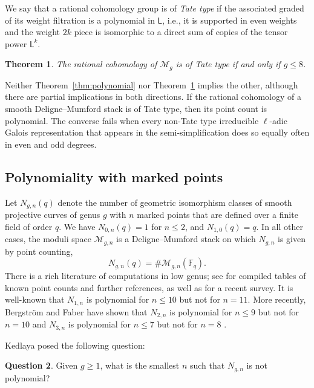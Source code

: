 \documentclass[12pt]{amsart}
\newtheorem{thm}{Theorem}[section]
\theoremstyle{definition}
\newtheorem{question}[thm]{Question}
\numberwithin{equation}{section}
\newcommand{\F}{\mathbb{F}}
\newcommand{\M}{\mathcal{M}}
\newcommand{\cM}{\mathcal{M}}
\theoremstyle{definition} %
\theoremstyle{remark}
\begin{document}
We say that a rational cohomology group is of \emph{Tate type} if the associated graded of its weight filtration is a polynomial in $\mathsf{L}$, i.e., it is supported in even weights and the weight $2k$ piece is isomorphic to a direct sum of copies of the tensor power $\mathsf{L}^{k}$.

\begin{thm} \label{thm:Tatetype}
The rational cohomology of $\M_g$ is of Tate type %
if and only if $g \leq 8$.
\end{thm}

Neither Theorem~\ref{thm:polynomial} nor Theorem~\ref{thm:Tatetype} implies the other, although there are partial implications in both directions. If the rational cohomology of a smooth Deligne--Mumford stack is of Tate type, then its point count is polynomial. The converse fails when every non-Tate type irreducible $\ell$-adic Galois representation that appears in the semi-simplification does so equally often in even and odd degrees. %


\subsection{Polynomiality with marked points}

Let $N_{g,n}(q)$ denote the number of geometric isomorphism classes of smooth projective curves of genus $g$ with $n$ marked points that are defined over a finite field of order $q$. We have $N_{0,n}(q) = 1$ for $n \leq 2$, and $N_{1,0}(q) = q$. In all other cases, the moduli space $\cM_{g,n}$ is a Deligne--Mumford stack on which $N_{g,n}$ is given by point counting, $$N_{g,n}(q) = \# \cM_{g,n}(\F_q).$$ There is a rich literature of computations in low genus; see \cite{BergstromData} for compiled tables of known point counts and further references, as well as \cite{vdg} for a recent survey. It is well-known that $N_{1,n}$ is polynomial for $n \leq 10$ but not for $n = 11$. More recently, Bergstr\"om and Faber have shown that  $N_{2,n}$ is polynomial for $n \leq 9$ but not for $n = 10$ and $N_{3,n}$ is polynomial for $n \leq 7$ but not for $n = 8$ \cite{BergstromFaber}. 

\medskip

Kedlaya posed the following question:

\begin{question}\label{quest:Kedlaya}
    Given $g\geq 1$, what is the smallest $n$ such that $N_{g,n}$ is not polynomial?
\end{question}
\end{document}
